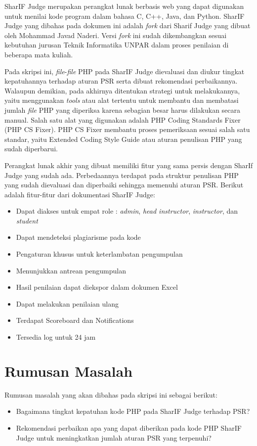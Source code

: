 SharIF Judge merupakan perangkat lunak berbasis web yang dapat digunakan untuk menilai kode program dalam bahasa C, C++, Java, dan Python. SharIF Judge \cite{SharIF_Judge} yang dibahas pada dokumen ini adalah \textit{fork} dari Sharif Judge \cite{Sharif_Judge_Original} yang dibuat oleh Mohammad Javad Naderi. Versi \textit{fork} ini sudah dikembangkan sesuai kebutuhan jurusan Teknik Informatika UNPAR dalam proses penilaian di beberapa mata kuliah.

Pada skripsi ini, \textit{file}-\textit{file} PHP pada SharIF Judge dievaluasi dan diukur tingkat kepatuhannya terhadap aturan PSR serta dibuat rekomendasi perbaikannya. Walaupun demikian, pada akhirnya ditentukan strategi untuk melakukannya, yaitu menggunakan \textit{tools} atau alat tertentu untuk membantu dan membatasi jumlah \textit{file} PHP yang diperiksa karena sebagian besar harus dilakukan secara manual. Salah satu alat yang digunakan adalah PHP Coding Standards Fixer (PHP CS Fixer). PHP CS Fixer membantu proses pemeriksaan sesuai salah satu standar, yaitu Extended Coding Style Guide atau aturan penulisan PHP yang sudah diperbarui. 

Perangkat lunak akhir yang dibuat memiliki fitur yang sama persis dengan SharIf Judge yang sudah ada. Perbedaannya terdapat pada struktur penulisan PHP yang sudah dievaluasi dan diperbaiki sehingga memenuhi aturan PSR. Berikut adalah fitur-fitur dari dokumentasi SharIF Judge:
\begin{itemize}
	\item Dapat diakses untuk empat role : \textit{admin}, \textit{head instructor}, \textit{instructor}, dan \textit{student}
	\item Dapat mendeteksi plagiarisme pada kode
	\item Pengaturan khusus untuk keterlambatan pengumpulan
	\item Menunjukkan antrean pengumpulan
	\item Hasil penilaian dapat diekspor dalam dokumen Excel
	\item Dapat melakukan penilaian ulang
	\item Terdapat Scoreboard dan Notifications
	\item Tersedia log untuk 24 jam 
\end{itemize}

\section{Rumusan Masalah}
\label{sec:rumusan}
Rumusan masalah yang akan dibahas pada skripsi ini sebagai berikut:
\begin{itemize}
	\item Bagaimana tingkat kepatuhan kode PHP pada SharIF Judge terhadap PSR?  
	\item Rekomendasi perbaikan apa yang dapat diberikan pada kode PHP SharIF Judge untuk meningkatkan jumlah aturan PSR yang terpenuhi?
\end{itemize}


